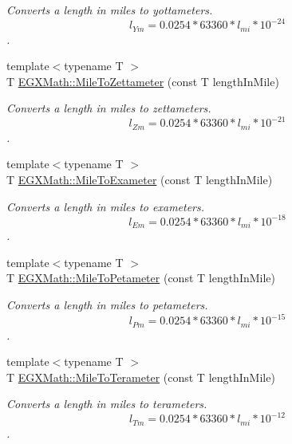 \begin{DoxyCompactItemize}
\begin{DoxyCompactList}\small\item\em Converts a length in miles to yottameters. \[ l_{Ym}=0.0254 * 63360 * l_{mi} * 10^{-24} \]. \end{DoxyCompactList}\item 
{\footnotesize template$<$typename T $>$ }\\T \mbox{\hyperlink{group___e_g_x_math-_conversions-_length_conversions-_imperial-_mile-_s_i_ga21202d0625220f09f6f49370f2226054}{E\+G\+X\+Math\+::\+Mile\+To\+Zettameter}} (const T length\+In\+Mile)
\begin{DoxyCompactList}\small\item\em Converts a length in miles to zettameters. \[ l_{Zm}=0.0254 * 63360 * l_{mi} * 10^{-21} \]. \end{DoxyCompactList}\item 
{\footnotesize template$<$typename T $>$ }\\T \mbox{\hyperlink{group___e_g_x_math-_conversions-_length_conversions-_imperial-_mile-_s_i_gaae78957f56d8632cb0edff21dc4e371c}{E\+G\+X\+Math\+::\+Mile\+To\+Exameter}} (const T length\+In\+Mile)
\begin{DoxyCompactList}\small\item\em Converts a length in miles to exameters. \[ l_{Em}=0.0254 * 63360 * l_{mi} * 10^{-18} \]. \end{DoxyCompactList}\item 
{\footnotesize template$<$typename T $>$ }\\T \mbox{\hyperlink{group___e_g_x_math-_conversions-_length_conversions-_imperial-_mile-_s_i_ga3371527a512df8e154f5c3b4703108e0}{E\+G\+X\+Math\+::\+Mile\+To\+Petameter}} (const T length\+In\+Mile)
\begin{DoxyCompactList}\small\item\em Converts a length in miles to petameters. \[ l_{Pm}=0.0254 * 63360 * l_{mi} * 10^{-15} \]. \end{DoxyCompactList}\item 
{\footnotesize template$<$typename T $>$ }\\T \mbox{\hyperlink{group___e_g_x_math-_conversions-_length_conversions-_imperial-_mile-_s_i_gaebf59d9cdca70b0714a8740790cbe355}{E\+G\+X\+Math\+::\+Mile\+To\+Terameter}} (const T length\+In\+Mile)
\begin{DoxyCompactList}\small\item\em Converts a length in miles to terameters. \[ l_{Tm}=0.0254 * 63360 * l_{mi} * 10^{-12} \]. \end{DoxyCompactList}\item 

\end{DoxyCompactItemize}
